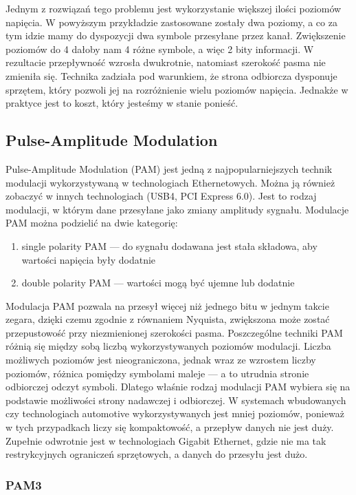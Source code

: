 Jednym z rozwiązań tego problemu jest wykorzystanie większej ilości poziomów napięcia. W powyższym przykładzie zastosowane zostały dwa poziomy, a co za tym idzie mamy do dyspozycji dwa symbole przesyłane przez kanał.
Zwiększenie poziomów do 4 dałoby nam 4 różne symbole, a więc 2 bity informacji. W rezultacie przepływność wzrosła dwukrotnie, natomiast szerokość pasma nie zmieniła się. Technika zadziała pod warunkiem, że strona odbiorcza dysponuje sprzętem, który pozwoli jej na
rozróżnienie wielu poziomów napięcia. Jednakże w praktyce jest to koszt, który jesteśmy w stanie ponieść.

\subsection{Pulse-Amplitude Modulation}

Pulse-Amplitude Modulation (PAM) jest jedną z najpopularniejszych technik modulacji wykorzystywaną w technologiach Ethernetowych. Można ją również zobaczyć w innych technologiach (USB4, PCI Express 6.0). Jest to rodzaj modulacji, w którym dane przesyłane jako zmiany amplitudy sygnału. Modulacje PAM można podzielić na dwie kategorię:

\begin{enumerate}
    \item single polarity PAM --- do sygnału dodawana jest stała składowa, aby wartości napięcia były dodatnie
    \item double polarity PAM --- wartości mogą być ujemne lub dodatnie
\end{enumerate}

Modulacja PAM pozwala na przesył więcej niż jednego bitu w jednym takcie zegara, dzięki czemu zgodnie z równaniem Nyquista, zwiększona może zostać przepustowość przy niezmienionej szerokości pasma.
Poszczególne techniki PAM różnią się między sobą liczbą wykorzystywanych poziomów modulacji. Liczba możliwych poziomów jest nieograniczona, jednak wraz ze wzrostem liczby poziomów, różnica pomiędzy symbolami maleje --- a to utrudnia stronie odbiorczej odczyt symboli. Dlatego właśnie rodzaj modulacji PAM wybiera się na podstawie możliwości strony nadawczej i odbiorczej. W systemach wbudowanych czy technologiach automotive wykorzystywanych jest mniej poziomów,
ponieważ w tych przypadkach liczy się kompaktowość, a przepływ danych nie jest duży. Zupełnie odwrotnie jest w technologiach Gigabit Ethernet, gdzie nie ma tak restrykcyjnych ograniczeń sprzętowych, a danych do przesyłu jest dużo.

\subsubsection{PAM3}

